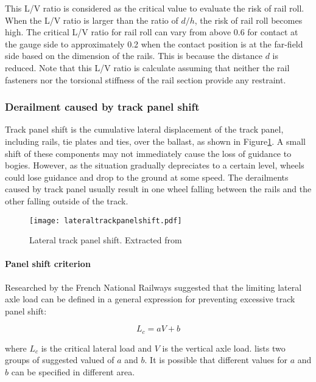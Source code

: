 This L/V ratio is considered as the critical value to evaluate the risk of rail roll. When the L/V ratio is larger than the ratio of $d/h$, the risk of rail roll becomes high. The critical L/V ratio for rail roll can vary from above 0.6 for contact at the gauge side to approximately 0.2 when the contact position is at the far-field side based on the dimension of the rails. This is because the distance $d$ is reduced. Note that this L/V ratio is calculate assuming that neither the rail fasteners nor the torsional stiffness of the rail section provide any restraint.

\subsubsection{Derailment caused by track panel shift}
Track panel shift is the cumulative lateral displacement of the track panel, including rails, tie plates and ties, over the ballast, as shown in Figure\ref{fig:lateraltrackpanelshift}. A small shift of these components may not immediately cause the loss of guidance to bogies. However, as the situation gradually depreciates to a certain level, wheels could lose guidance and drop to the ground at some speed. The derailments caused by track panel usually result in one wheel falling between the rails and the other falling outside of the track.

\begin{figure}[h]
    \centering
    \texttt{[image: lateraltrackpanelshift.pdf]}
    \caption{Lateral track panel shift. Extracted from \cite[Figure8.27]{iwnicki2006handbook}}
    \label{fig:lateraltrackpanelshift}
\end{figure}

\paragraph{Panel shift criterion}
Researched by the French National Railways suggested that the limiting lateral axle load can be defined in a general expression for preventing excessive track panel shift:

\begin{equation}
    L_c = aV+b
\end{equation}

where $L_c$ is the critical lateral load and $V$ is the vertical axle load. \cite[Table 8.2]{iwnicki2006handbook} lists two groups of suggested valued of $a$ and $b$. It is possible that different values for $a$ and $b$ can be specified in different area.

